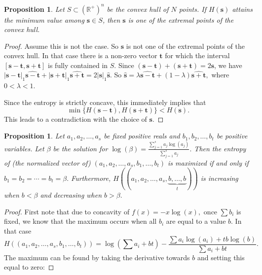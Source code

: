\documentclass{article}
\newtheorem{prop}[defi]{Proposition}
\newcommand*{\abs}[1]{\lvert #1\rvert}
\def \b{\beta}
\begin{document}
{\begin{prop}\label{prop:concavity_entropy}
    Let $S \subset (\mathbb R^+)^n$ be the convex hull of $N$ points.
    If $H(\mathbf{s})$ attains the minimum value among $\mathbf{s} \in S$, then $\mathbf{s}$ is one of the extremal points of the convex hull.
\end{prop}

\begin{proof}
    Assume this is not the case. So %
    $\mathbf{s}$ is not one of the extremal points of the convex hull.
    In that case there is a non-zero 
    vector $\mathbf{t}$ for which the interval $\left[\mathbf{s-t}, \mathbf{s+t}\right]$ is fully contained in $S$.
    Since $(\mathbf{s-t})+( \mathbf{s+t})= 2 \mathbf{s}$, we have
    $\abs{ \mathbf{s-t} }_1 \widehat{ \mathbf{s-t} }   + \abs{\mathbf{s+t} }_1 \widehat{ \mathbf{s+t} } = 2 \abs{\mathbf{s} }_1 \widehat{ \mathbf{s} }.$
    So $ \widehat{\mathbf{s}} = \lambda \widehat{\mathbf{s-t}}  + (1-\lambda) \widehat{\mathbf{s+t}},$ where $0<\lambda<1$.
    
    Since the entropy is strictly concave, this immediately implies that 
    $$\min\{H(\mathbf{s-t}), H(\mathbf{s+t})\} <H(\mathbf{s}).$$
    This leads to a contradiction with the choice of $\mathbf{s}.$
\end{proof}


\begin{prop}\label{prop:fix_max_entropy}
    Let $a_1,a_2, \ldots, a_s$ be fixed positive reals and $b_1,b_2, \ldots, b_t$ be positive variables.
    Let $\b$ be the solution for $\log(\b) = \frac{ \sum_{j=1}^s a_j \log(a_j) }{ \sum_{j=1}^s a_j }.$
    Then the entropy of (the normalized vector of) $(a_1,a_2, \ldots, a_s,b_1, \ldots, b_t)$ is maximized if and only if 
    $b_1=b_2=\cdots =b_t=\b.$
    Furthermore, $H\left((a_1,a_2, \ldots, a_s,\underbrace{b, \ldots, b}_{t }) \right)$ is increasing when $b<\b$ and decreasing when $b>\b.$
\end{prop} 

\begin{proof}
    First note that due to concavity of $f(x)=-x \log(x),$ once $\sum b_i $ is fixed, we know that the maximum occurs when all $b_i$ are equal to a value $b$.
    In that case $$H((a_1,a_2, \ldots, a_s,b_1, \ldots, b_t)) = \log\left(\sum a_i + bt\right) - \frac{ \sum a_i \log(a_i) + tb \log(b)}{\sum a_i + bt}.$$
    The maximum can be found by taking the derivative towards $b$ and setting this equal to zero:


\end{proof}}
\end{document}
